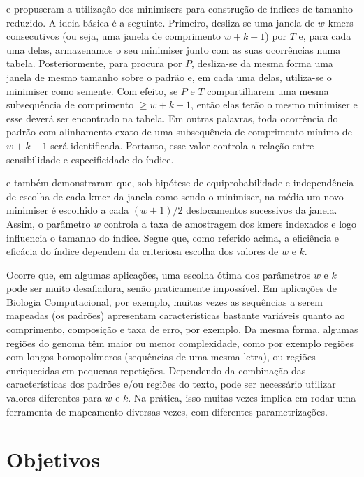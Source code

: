 \documentclass[12pt, a4paper, oneside]{article}
\begin{document}
\cite{} e \cite{} propuseram a utilização dos minimisers para construção de índices de tamanho reduzido. A ideia básica é a seguinte. Primeiro, desliza-se uma janela de $w$ kmers consecutivos (ou seja, uma janela de comprimento $w+k-1$) por $T$ e, para cada uma delas, armazenamos o seu minimiser junto com as suas ocorrências numa tabela. Posteriormente, para procura por $P$, desliza-se da mesma forma uma janela de mesmo tamanho sobre o padrão e, em cada uma delas, utiliza-se o minimiser como semente. Com efeito, se $P$ e $T$ compartilharem uma mesma subsequência de comprimento $\geq w+k-1$, então elas terão o mesmo minimiser e esse deverá ser encontrado na tabela. Em outras palavras, toda ocorrência do padrão com alinhamento exato de uma subsequência de comprimento mínimo de $w+k-1$ será identificada. Portanto, esse valor controla a relação entre sensibilidade e especificidade do índice.

\cite{} e \cite{} também demonstraram que, sob hipótese de equiprobabilidade e independência de escolha de cada kmer da janela como sendo o minimiser, na média um novo minimiser é escolhido a cada $(w+1)/2$ deslocamentos sucessivos da janela. Assim, o parâmetro $w$ controla a taxa de amostragem dos kmers indexados e logo influencia o tamanho do índice. Segue que, como referido acima, a eficiência e eficácia do índice dependem da criteriosa escolha dos valores de $w$ e $k$.

Ocorre que, em algumas aplicações, uma escolha ótima dos parâmetros $w$ e $k$ pode ser muito desafiadora, senão praticamente impossível. Em aplicações de Biologia Computacional, por exemplo, muitas vezes as sequências a serem mapeadas (os padrões) apresentam características bastante variáveis quanto ao comprimento, composição e taxa de erro, por exemplo. Da mesma forma, algumas regiões do genoma têm maior ou menor complexidade, como por exemplo regiões com longos homopolímeros (sequências de uma mesma letra), ou  regiões enriquecidas em pequenas repetições. Dependendo da combinação das características dos padrões e/ou regiões do texto, pode ser necessário utilizar valores diferentes para $w$ e $k$. Na prática, isso muitas vezes implica em rodar uma ferramenta de mapeamento diversas vezes, com diferentes parametrizações.



\clearpage
\section{Objetivos}
\end{document}
